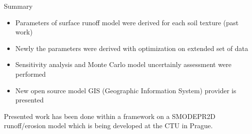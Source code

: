 \begin{alertblock}{Summary}
    {\large
    \begin{itemize}
        \item Parameters of surface runoff model were derived for each soil texture (past work)
        \item Newly the parameters were derived with optimization on extended set of data
        \item Sensitivity analysis and Monte Carlo model uncertainly assessment were performed
        \item New open source model GIS (Geographic Information
          System) provider is presented
    \end{itemize}
    }
\end{alertblock}\vspace{0.9cm}





\justifying
{\rmfamily
Presented work has been done within a framework on a SMODEPR2D runoff/erosion model which is being developed at the CTU in Prague.
}
